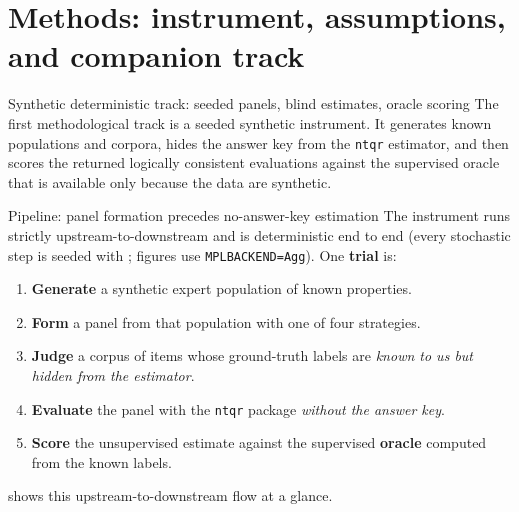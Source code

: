 \documentclass[
  ignorenonframetext,
]{beamer}
\author{\texorpdfstring{}{}}
\date{}
\providecommand{\tightlist}{%
  \setlength{\itemsep}{0pt}\setlength{\parskip}{0pt}}
\begin{document}
\section{Methods: instrument, assumptions, and companion
track}\label{methods-instrument-assumptions-and-companion-track}

\begin{frame}{Synthetic deterministic track:
seeded panels, blind estimates, oracle scoring}
\protect{}\label{synthetic-deterministic-track-seeded-panels-blind-estimates-oracle-scoring}
The first methodological track is a seeded synthetic instrument. It
generates known populations and corpora, hides the answer key from the
\texttt{ntqr} estimator, and then scores the returned logically
consistent evaluations against the supervised oracle that is available
only because the data are synthetic.

\begin{block}{Pipeline: panel formation precedes no-answer-key
estimation}
\protect{}\label{pipeline-panel-formation-precedes-no-answer-key-estimation}
The instrument runs strictly upstream-to-downstream and is deterministic
end to end (every stochastic step is seeded with
; figures use
\texttt{MPLBACKEND=Agg}). One \textbf{trial} is:

\begin{enumerate}
\tightlist
\item
  \textbf{Generate} a synthetic expert population of known properties.
\item
  \textbf{Form} a panel from that population with one of four
  strategies.
\item
  \textbf{Judge} a corpus of items whose ground-truth labels are
  \emph{known to us but hidden from the estimator}.
\item
  \textbf{Evaluate} the panel with the \texttt{ntqr} package
  \emph{without the answer key}.
\item
  \textbf{Score} the unsupervised estimate against the supervised
  \textbf{oracle} computed from the known labels.
\end{enumerate}

 shows this upstream-to-downstream flow at a glance.


\end{block}
\end{frame}
\end{document}
